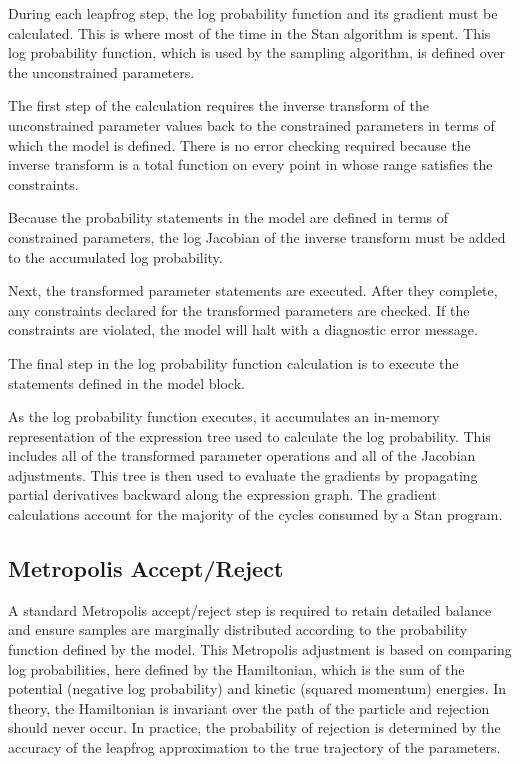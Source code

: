 During each leapfrog step, the log probability function and its
gradient must be calculated.  This is where most of the time in the
Stan algorithm is spent.  This log probability function, which is
used by the sampling algorithm, is defined over the unconstrained
parameters.

The first step of the calculation requires the inverse transform of
the unconstrained parameter values back to the constrained parameters
in terms of which the model is defined.  There is no error checking
required because the inverse transform is a total function on every point
in whose range satisfies the constraints.

Because the probability statements in the model are defined in terms
of constrained parameters, the log Jacobian of the inverse transform
must be added to the accumulated log probability.

Next, the transformed parameter statements are executed.  After they
complete, any constraints declared for the transformed parameters are
checked.  If the constraints are violated, the model will halt with a
diagnostic error message.

The final step in the log probability function calculation is to
execute the statements defined in the model block.  

As the log probability function executes, it accumulates an in-memory
representation of the expression tree used to calculate the log
probability.  This includes all of the transformed parameter
operations and all of the Jacobian adjustments.  This tree is then
used to evaluate the gradients by propagating partial derivatives
backward along the expression graph.  The gradient calculations
account for the majority of the cycles consumed by a Stan program.

\subsection{Metropolis Accept/Reject}

A standard Metropolis accept/reject step is required to retain detailed
balance and ensure samples are marginally distributed according to the
probability function defined by the model.  This Metropolis adjustment
is based on comparing log probabilities, here defined by the
Hamiltonian, which is the sum of the potential (negative log
probability) and kinetic (squared momentum) energies.  In theory, the
Hamiltonian is invariant over the path of the particle and rejection
should never occur.  In practice, the probability of rejection is
determined by the accuracy of the leapfrog approximation to the true
trajectory of the parameters.

